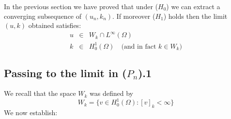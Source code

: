 \documentclass{elsart}
\begin{document}
In the previous section we have proved that under ($H_0$) we can
extract a converging subsequence of $(u_n,k_n)$. If moreover ($H_1$)
holds then the limit $(u,k)$ obtained satisfies: 
\begin{eqnarray}
u &\in& W_k \cap L^{\infty}(\Omega) \label{3.1.a} \\ 
k &\in& H^1_0(\Omega) \quad \text{(and in fact } k\in W_k\text{)} \label{3.1.b}
\end{eqnarray}

\subsection{Passing to the limit in ($P_n$).1}

We recall that the space $W_k$ was defined by 
$$W_k = \Big\{ v \in H^1_0(\Omega) : [v]_k < \infty \Big\}$$
We now establish: 
\end{document}
